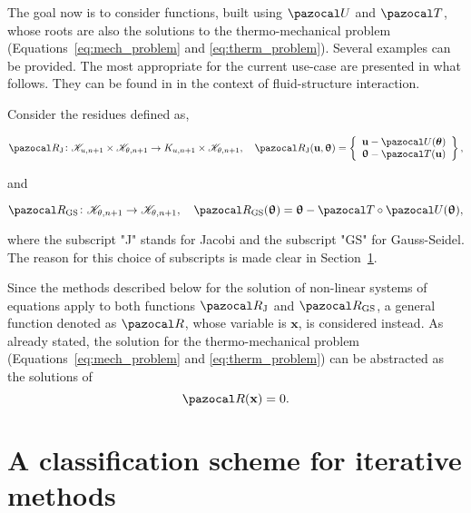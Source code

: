 The goal now is to consider functions, built using \(\pazocal U\) and \(\pazocal T\), whose roots are also the solutions to the thermo-mechanical problem (Equations~\eqref{eq:mech_problem} and \eqref{eq:therm_problem}).
Several examples can be provided.
The most appropriate for the current use-case are presented in what follows.
They can be found in \cite{uekermann_partitioned_2016} in the context of fluid-structure interaction.

Consider the residues defined as,
\begin{highlight}
\begin{equation} \label{eq:def_res_jacobi}
  \pazocal R_\text{J}\colon \mathscr K_{u,n+1}\times\mathscr K_{\theta,n+1} \to K_{u,n+1}\times\mathscr K_{\theta,n+1},\quad  \pazocal R_\text{J}(\mathbf u, \bm \uptheta) =
  \left\{\begin{array}{c}
  \mathbf u - \pazocal U(\bm \theta)\\
  \bm \uptheta - \pazocal T(\mathbf u)
  \end{array}\right\},
\end{equation}
\end{highlight}
and
\begin{highlight}
\begin{equation} \label{eq:def_res_gauss_seidel}
  \pazocal R_\text{GS}\colon \mathscr K_{\theta,n+1} \to\mathscr K_{\theta,n+1},\quad \pazocal R_\text{GS}(\bm \uptheta) =
  \bm \uptheta - \pazocal T\circ \pazocal U(\bm \uptheta),
\end{equation}
\end{highlight}
where the subscript "J" stands for Jacobi and the subscript "GS" for Gauss-Seidel.
The reason for this choice of subscripts is made clear in Section~\ref{}.

Since the methods described below for the solution of non-linear systems of equations apply to both functions \(\pazocal R_\mathrm{J}\) and \(\pazocal R_\mathrm{GS}\), a general function denoted as \(\pazocal R\), whose variable is \(\mathbf x\), is considered instead.
As already stated, the solution for the thermo-mechanical problem (Equations~\eqref{eq:mech_problem} and \eqref{eq:therm_problem}) can be abstracted as the solutions of
\begin{equation} \label{eq:abstract_residue_equation}
  \pazocal R(\mathbf x) = 0.
\end{equation}


\section{A classification scheme for iterative methods}

